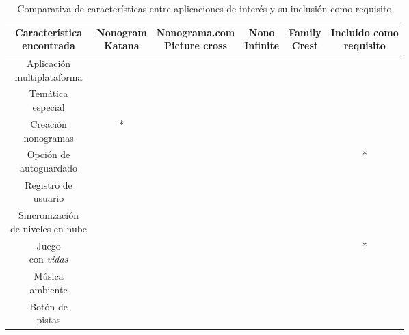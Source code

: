 \documentclass[11pt,spanish,listoffigures,listoftables]{tfgetsinf}
\begin{document}
\renewcommand\theadalign{b}
\renewcommand\theadfont{\bfseries}
\renewcommand\theadgape{\Gape[1pt]}
\renewcommand\cellgape{\Gape[1pt]}
\newcommand{\cmark}{{\ding{51}}}
\newcommand{\xmark}{{\ding{55}}}
\begin{table}[H]
  \caption{Comparativa de características entre aplicaciones de interés y su inclusión como requisito}
    \begin{tabular}{ | c | c | c | c | c | c |}
      \hline
      \thead{Característica \\ encontrada} & \thead{Nonogram \\ Katana} & \thead{Nonograma.com \\ Picture cross} & \thead{Nono \\ Infinite} & \thead{Family \\ Crest} & \thead{Incluido como \\ requisito} \\
      \hline
      \makecell{Aplicación \\ multiplataforma} &  \cmark  & \cmark  & \xmark & \cmark & \cmark \\
      \hline
      \makecell{Temática \\ especial} &  \cmark  & \xmark  & \cmark & \cmark & \cmark \\
      \hline
      \makecell{Creación \\ nonogramas} &  \cmark*  & \xmark  & \xmark & \xmark & \cmark \\
      \hline
      \makecell{Opción de \\ autoguardado} &  \cmark  & \cmark  & \xmark & \xmark & \cmark* \\
      \hline
      \makecell{Registro de \\ usuario} &  \cmark  & \xmark  & \xmark & \xmark & \xmark \\
      \hline
      \makecell{Sincronización \\de niveles en nube} &  \cmark  & \xmark  & \xmark & \xmark & \cmark \\
      \hline
      \makecell{Juego \\ con \textit{vidas}} &  \xmark  & \cmark  & \xmark & \xmark & \cmark* \\
      \hline
      \makecell{Música \\ ambiente} &  \xmark  & \xmark  & \xmark & \cmark & \xmark \\
      \hline
      \makecell{Botón de \\ pistas} &  \xmark  & \cmark  & \xmark & \xmark & \xmark \\

\end{tabular}
\end{table}
\end{document}
